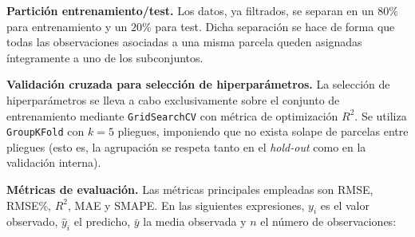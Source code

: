 \noindent\textbf{Partición entrenamiento/test.} Los datos, ya filtrados, se separan en un $80\%$ para entrenamiento y un $20\%$ para test. Dicha separación se hace de forma que todas las observaciones asociadas a una misma parcela queden asignadas íntegramente a uno de los subconjuntos.

\noindent\textbf{Validación cruzada para selección de hiperparámetros.} La selección de hiperparámetros se lleva a cabo exclusivamente sobre el conjunto de entrenamiento mediante \texttt{GridSearchCV} con métrica de optimización $R^2$. Se utiliza \texttt{GroupKFold} con $k=5$ pliegues, imponiendo que no exista solape de parcelas entre pliegues (esto es, la agrupación se respeta tanto en el \emph{hold-out} como en la validación interna).

\vspace{0.25em}
\vspace{0.25em}
\noindent\textbf{Métricas de evaluación.} Las métricas principales empleadas son RMSE, RMSE\%, $R^2$, MAE y SMAPE. En las siguientes expresiones, $y_i$ es el valor observado, $\hat{y}_i$ el predicho, $\bar{y}$ la media observada y $n$ el número de observaciones:


